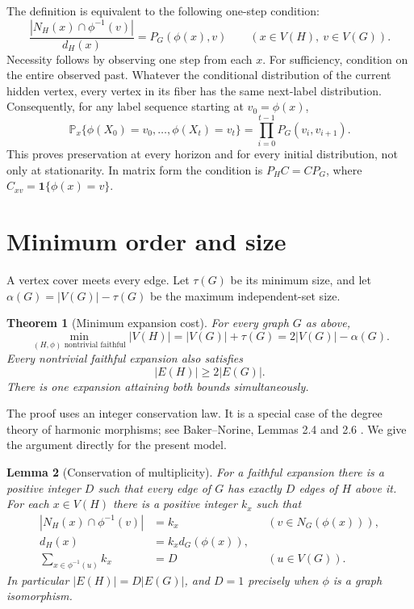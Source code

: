 \documentclass[11pt]{article}
\newtheorem{theorem}{Theorem}[section]
\newtheorem{lemma}[theorem]{Lemma}
\theoremstyle{definition}
\numberwithin{equation}{section}
\newcommand{\V}{V}
\newcommand{\E}{E}
\newcommand{\N}{N}
\newcommand{\Prob}{\mathbb P}
\begin{document}
The definition is equivalent to the following one-step condition:
\begin{equation}\label{eq:local}
 \frac{|\N_H(x)\cap\phi^{-1}(v)|}{d_H(x)}
       =P_G(\phi(x),v) \qquad(x\in\V(H),\ v\in\V(G)).
\end{equation}
Necessity follows by observing one step from each $x$. For sufficiency,
condition on the entire observed past. Whatever the conditional distribution
of the current hidden vertex, every vertex in its fiber has the same
next-label distribution. Consequently, for any label sequence starting at
$v_0=\phi(x)$,
\[
 \Prob_x\{\phi(X_0)=v_0,\ldots,\phi(X_t)=v_t\}
       =\prod_{i=0}^{t-1}P_G(v_i,v_{i+1}).
\]
This proves preservation at every horizon and for every initial distribution,
not only at stationarity. In matrix form the condition is $P_HC=CP_G$,
where $C_{xv}=\mathbf1\{\phi(x)=v\}$.

\section{Minimum order and size}\label{sec:minimum}

A vertex cover meets every edge. Let $\tau(G)$ be its minimum size, and let
$\alpha(G)=|\V(G)|-\tau(G)$ be the maximum independent-set size.

\begin{theorem}[Minimum expansion cost]\label{thm:main}
For every graph $G$ as above,
\[
 \boxed{\min_{(H,\phi)\text{ nontrivial faithful}}|\V(H)|
        =|\V(G)|+\tau(G)=2|\V(G)|-\alpha(G).}
\]
Every nontrivial faithful expansion also satisfies
\[
 |\E(H)|\ge 2|\E(G)|.
\]
There is one expansion attaining both bounds simultaneously.
\end{theorem}

The proof uses an integer conservation law. It is a special case of the
degree theory of harmonic morphisms; see Baker--Norine, Lemmas 2.4 and 2.6
\cite{BN}. We give the argument directly for the present model.

\begin{lemma}[Conservation of multiplicity]\label{lem:degree}
For a faithful expansion there is a positive integer $D$ such that every
edge of $G$ has exactly $D$ edges of $H$ above it. For each $x\in\V(H)$ there
is a positive integer $k_x$ such that
\begin{align}
 |\N_H(x)\cap\phi^{-1}(v)|&=k_x
                    &&(v\in\N_G(\phi(x))),\label{eq:k}\\
 d_H(x)&=k_x d_G(\phi(x)),\\
 \sum_{x\in\phi^{-1}(u)}k_x&=D
                    &&(u\in\V(G)).\label{eq:fiber}
\end{align}
In particular $|\E(H)|=D|\E(G)|$, and $D=1$ precisely when $\phi$ is a graph
isomorphism.
\end{lemma}
\end{document}
